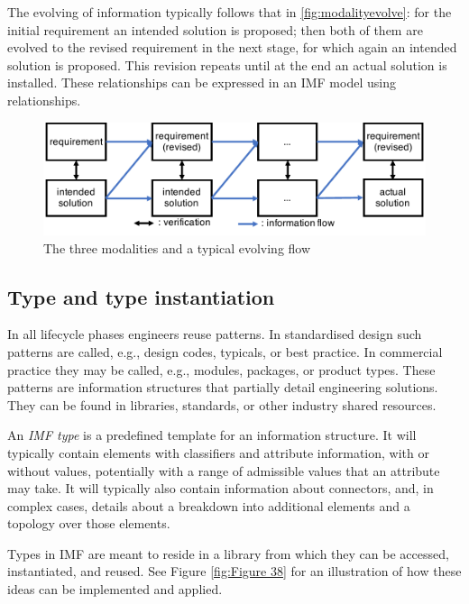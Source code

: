 \documentclass[../main.tex]{subfiles}
\begin{document}
The evolving of information typically follows that in \autoref{fig:modalityevolve}: for the initial requirement an intended solution is proposed; then both of them are evolved to the revised requirement in the next stage, for which again an intended solution is proposed. This revision repeats until at the end an actual solution is installed. 
These relationships can be expressed in an IMF model using  relationships.

\begin{figure}[htb]
  \centering
  \includegraphics[width=.8\textwidth]{img/modalityevolve.pdf}
  \caption{The three modalities and a typical evolving flow}
  \label{fig:modalityevolve}
\end{figure}

\subsection{Type and type instantiation}
\label{sec:Type}



In all lifecycle phases engineers reuse patterns. In standardised design such patterns are called, e.g., design codes, typicals, or best practice. In commercial practice they may be called, e.g., modules, packages, or product types. 
These patterns are information structures that partially detail engineering solutions.
They can be found in libraries, standards, or other industry shared resources. 

An \emph{IMF type} is a predefined template for an information structure. It will typically contain elements with classifiers and attribute information, with or without values, potentially with a range of admissible values that an attribute may take. It will typically also contain information about connectors, and, in complex cases,  details about a breakdown into additional elements and a topology over those elements. 

Types in IMF are meant to reside in a library from which they can be accessed, instantiated, and reused. 
See Figure \ref{fig:Figure 38} for an illustration of how these ideas can be implemented and applied. 
\end{document}
